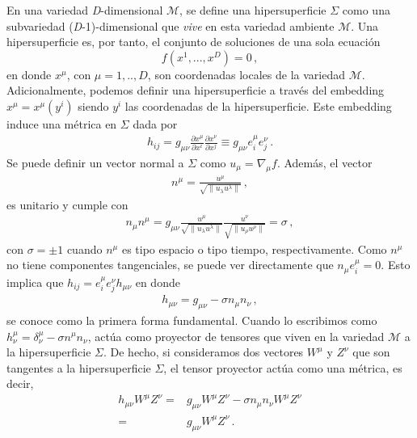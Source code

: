 \documentclass[../Main.tex]{subfiles}
\begin{document}
En una variedad \textit{D}-dimensional $\mathcal{M}$, se define una hipersuperficie $\Sigma$ como una subvariedad (\textit{D}-1)-dimensional que \textit{vive} en esta variedad ambiente $\mathcal{M}$. Una hipersuperficie es, por tanto, el conjunto de soluciones de una sola ecuación
\begin{equation}
    f(x^{1},...,x^{D})=0 \, ,
\end{equation}
en donde $x^{\mu}$, con $\mu=1,..,D$, son coordenadas locales de la variedad $\mathcal{M}$. Adicionalmente, podemos definir una hipersuperficie a través del embedding $x^{\mu}=x^{\mu}(y^{i})$ siendo $y^{i}$ las coordenadas de la hipersuperficie. Este embedding induce una métrica en $\Sigma$ dada por
\begin{align}
    h_{ij}=g_{\mu\nu}\frac{\partial x^{\mu}}{\partial x^{i}}\frac{\partial x^{\nu}}{\partial x^{j}} \equiv g_{\mu\nu} e^{\mu}_{i}e^{\nu}_{j}\, .
\end{align} 
Se puede definir un vector normal a $\Sigma$ como $u_{\mu}=\nabla_{\mu}f$. Además, el vector 
\begin{align}
    n^{\mu}=\frac{u^{\mu}}{\sqrt{ \|u_{\lambda}u^{\lambda}\|}} \, , \label{norm}
\end{align}
es unitario y cumple con
\begin{align}
    n_{\mu}n^{\mu}=g_{\mu\nu}\frac{u^{\mu}}{\sqrt{ \|u_{\lambda}u^{\lambda}\|}}\frac{u^{\nu}}{\sqrt{ \|u_{\rho}u^{\rho}\|}}=\sigma \, ,
\end{align}
con $\sigma=\pm 1$ cuando $n^{\mu}$ es tipo espacio o tipo tiempo, respectivamente. Como $n^{\mu}$ no tiene componentes tangenciales, se puede ver directamente que $n_{\mu}e^{\mu}_{i}=0$. Esto implica que $ h_{ij}=e^{\mu}_{i}e^{\nu}_{j}h_{\mu\nu}$ en donde 
\begin{align}
    h_{\mu\nu}=g_{\mu\nu}-\sigma n_{\mu}n_{\nu} \, , \label{pro}
\end{align}
se conoce como la primera forma fundamental. Cuando lo escribimos como $h^{\mu}_{\nu}=\delta^{\mu}_{\nu}-\sigma n^{\mu}n_{\nu}$, actúa como proyector de tensores que viven en la variedad $\mathcal{M}$ a la hipersuperficie $\Sigma$. De hecho, si consideramos dos vectores $W^{\mu}$ y $Z^{\nu}$ que son tangentes a la hipersuperficie $\Sigma$, el tensor proyector actúa como una métrica, es decir,
\begin{align} \nonumber
h_{\mu\nu}W^{\mu}Z^{\nu}=&g_{\mu\nu}W^{\mu}Z^{\nu}-\sigma n_{\mu}n_{\nu}W^{\mu}Z^{\nu}\\
    =&g_{\mu\nu}W^{\mu}Z^{\nu}\, .
\end{align}
\end{document}

